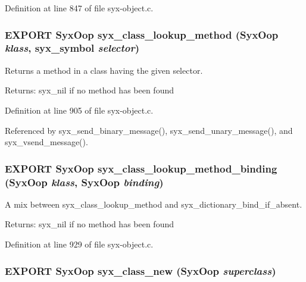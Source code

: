 Definition at line 847 of file syx-object.c.\hypertarget{syx-object_8h_fbffd7cc207f40f18ba6da769f214ed4}{
\subsubsection{\setlength{\rightskip}{0pt plus 5cm}EXPORT {\bf SyxOop} syx\_\-class\_\-lookup\_\-method ({\bf SyxOop} {\em klass}, \/  {\bf syx\_\-symbol} {\em selector})}}
\label{syx-object_8h_fbffd7cc207f40f18ba6da769f214ed4}


Returns a method in a class having the given selector.

\begin{Desc}
\item[Returns:]syx\_\-nil if no method has been found \end{Desc}


Definition at line 905 of file syx-object.c.

Referenced by syx\_\-send\_\-binary\_\-message(), syx\_\-send\_\-unary\_\-message(), and syx\_\-vsend\_\-message().\hypertarget{syx-object_8h_6f70b46648620575942260a24264cb8f}{
\subsubsection{\setlength{\rightskip}{0pt plus 5cm}EXPORT {\bf SyxOop} syx\_\-class\_\-lookup\_\-method\_\-binding ({\bf SyxOop} {\em klass}, \/  {\bf SyxOop} {\em binding})}}
\label{syx-object_8h_6f70b46648620575942260a24264cb8f}


A mix between syx\_\-class\_\-lookup\_\-method and syx\_\-dictionary\_\-bind\_\-if\_\-absent.

\begin{Desc}
\item[Returns:]syx\_\-nil if no method has been found \end{Desc}


Definition at line 929 of file syx-object.c.\hypertarget{syx-object_8h_15348943e9bdd2ca68f7c4aeee628c9a}{
\subsubsection{\setlength{\rightskip}{0pt plus 5cm}EXPORT {\bf SyxOop} syx\_\-class\_\-new ({\bf SyxOop} {\em superclass})}}
\label{syx-object_8h_15348943e9bdd2ca68f7c4aeee628c9a}


